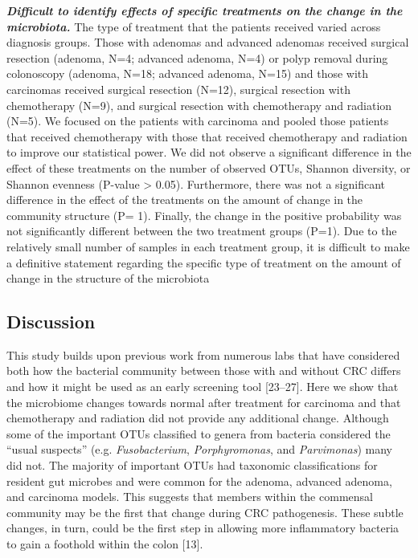 \documentclass[12pt,]{article}
\begin{document}
\textbf{\emph{Difficult to identify effects of specific treatments on
the change in the microbiota.}} The type of treatment that the patients
received varied across diagnosis groups. Those with adenomas and
advanced adenomas received surgical resection (adenoma, N=4; advanced
adenoma, N=4) or polyp removal during colonoscopy (adenoma, N=18;
advanced adenoma, N=15) and those with carcinomas received surgical
resection (N=12), surgical resection with chemotherapy (N=9), and
surgical resection with chemotherapy and radiation (N=5). We focused on
the patients with carcinoma and pooled those patients that received
chemotherapy with those that received chemotherapy and radiation to
improve our statistical power. We did not observe a significant
difference in the effect of these treatments on the number of observed
OTUs, Shannon diversity, or Shannon evenness (P-value \textgreater{}
0.05). Furthermore, there was not a significant difference in the effect
of the treatments on the amount of change in the community structure (P=
1). Finally, the change in the positive probability was not
significantly different between the two treatment groups (P=1). Due to
the relatively small number of samples in each treatment group, it is
difficult to make a definitive statement regarding the specific type of
treatment on the amount of change in the structure of the microbiota

\newpage

\subsection{Discussion}\label{discussion}

This study builds upon previous work from numerous labs that have
considered both how the bacterial community between those with and
without CRC differs and how it might be used as an early screening tool
{[}23--27{]}. Here we show that the microbiome changes towards normal
after treatment for carcinoma and that chemotherapy and radiation did
not provide any additional change. Although some of the important OTUs
classified to genera from bacteria considered the ``usual suspects''
(e.g. \emph{Fusobacterium}, \emph{Porphyromonas}, and \emph{Parvimonas})
many did not. The majority of important OTUs had taxonomic
classifications for resident gut microbes and were common for the
adenoma, advanced adenoma, and carcinoma models. This suggests that
members within the commensal community may be the first that change
during CRC pathogenesis. These subtle changes, in turn, could be the
first step in allowing more inflammatory bacteria to gain a foothold
within the colon {[}13{]}.
\end{document}
